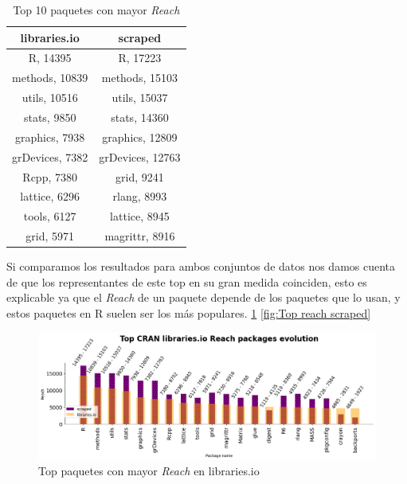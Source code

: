 \begin{table}[h!]
    \begin{center}
        \begin{tabular}{|c|c|}
            \hline
            \textbf{libraries.io} & \textbf{scraped} \\
            \hline
            R, 14395              & R, 17223         \\
            methods, 10839        & methods, 15103   \\
            utils, 10516          & utils, 15037     \\
            stats, 9850           & stats, 14360     \\
            graphics, 7938        & graphics, 12809  \\
            grDevices, 7382       & grDevices, 12763 \\
            Rcpp, 7380            & grid, 9241       \\
            lattice, 6296         & rlang, 8993      \\
            tools, 6127           & lattice, 8945    \\
            grid, 5971            & magrittr, 8916   \\
            \hline
        \end{tabular}
        \caption{Top 10 paquetes con mayor \textit{Reach}}
        \label{tab:Top 10 paquetes con mayor Reach}
    \end{center}
\end{table}

Si comparamos los resultados para ambos conjuntos de datos nos damos cuenta de que
los representantes de este top en su gran medida coinciden, esto es explicable ya que
el \textit{Reach} de un paquete depende de los paquetes que lo usan, y estos paquetes
en R suelen ser los más populares. \ref{fig:Top reach libraries.io} \ref{fig:Top reach scraped}


\begin{figure}[h!]
    \begin{center}
        \includegraphics[width=1\textwidth]{img/cran/reach_top.png}
        \caption{Top paquetes con mayor \textit{Reach} en libraries.io}
        \label{fig:Top reach libraries.io}
    \end{center}
\end{figure}

